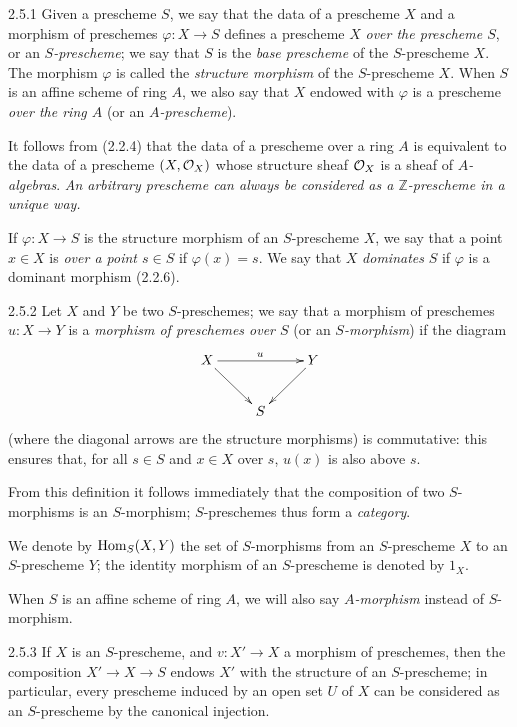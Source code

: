 
\begin{env}[Definition]{2.5.1}
    Given a prescheme $S$, we say that the data of a prescheme $X$ and a morphism of preschemes $\varphi\colon X\to S$ defines a prescheme $X$ \emph{over the prescheme $S$}, or an \emph{$S$-prescheme}; we say that $S$ is the \emph{base prescheme} of the $S$-prescheme $X$.
    The morphism $\varphi$ is called the \emph{structure morphism} of the $S$-prescheme $X$.
    When $S$ is an affine scheme of ring $A$, we also say that $X$ endowed with $\varphi$ is a prescheme \emph{over the ring $A$} (or an \emph{$A$-prescheme}).
\end{env}

It follows from (2.2.4) that the data of a prescheme over a ring $A$ is equivalent to the data of a prescheme $(X,\mathcal{O}_X)$ whose structure sheaf $\mathcal{O}_X$ is a sheaf of \emph{$A$-algebras}.
\emph{An arbitrary prescheme can always be considered as a $\mathbb{Z}$-prescheme in a unique way.}

If $\varphi\colon X\to S$ is the structure morphism of an $S$-prescheme $X$, we say that a point $x\in X$ is \emph{over a point $s\in S$} if $\varphi(x)=s$.
We say that $X$ \emph{dominates} $S$ if $\varphi$ is a dominant morphism (2.2.6).

\begin{env}{2.5.2}
    Let $X$ and $Y$ be two $S$-preschemes; we say that a morphism of preschemes $u\colon X\to Y$ is a \emph{morphism of preschemes over $S$} (or an \emph{$S$-morphism}) if the diagram
    \[
      \xymatrix{
        X \ar[rr]^u \ar[dr] & & Y \ar[dl]\\
        & S &
      }
    \]
    (where the diagonal arrows are the structure morphisms) is commutative: this ensures that, for all $s\in S$ and $x\in X$ over $s$, $u(x)$ is also above $s$.
\end{env}

From this definition it follows immediately that the composition of two $S$-morphisms is an $S$-morphism; $S$-preschemes thus form a \emph{category}.

We denote by $\operatorname{Hom}_S(X,Y)$ the set of $S$-morphisms from an $S$-prescheme $X$ to an $S$-prescheme $Y$; the identity morphism of an $S$-prescheme is denoted by $1_X$.

When $S$ is an affine scheme of ring $A$, we will also say \emph{$A$-morphism} instead of $S$-morphism.

\begin{env}{2.5.3}
    If $X$ is an $S$-prescheme, and $v\colon X'\to X$ a morphism of preschemes, then the composition $X'\to X\to S$ endows $X'$ with the structure of an $S$-prescheme; in particular, every prescheme induced by an open set $U$ of $X$ can be considered as an $S$-prescheme by the canonical injection.
\end{env}

